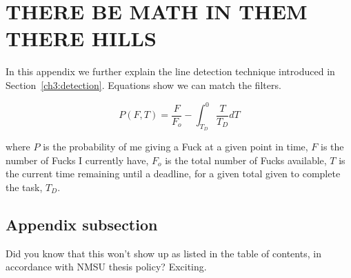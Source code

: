 \label{appendix}
\section{\MakeUppercase{There Be Math in Them There Hills}}

In this appendix we further explain the line detection technique introduced in Section~\ref{ch3:detection}. Equations show we can match the filters.

\begin{equation}
P(F,T) = \frac{F}{F_o} - \int_{T_D}^{0}{\frac{T}{T_D}dT}
\end{equation}

where $P$ is the probability of me giving a Fuck at a given point in time, $F$ is the number of Fucks I currently have, $F_o$ is the total number of Fucks available, $T$ is the current time remaining until a deadline, for a given total given to complete the task, $T_D$.

\subsection{Appendix subsection}

Did you know that this won't show up as listed in the table of contents, in accordance with NMSU thesis policy? Exciting.
